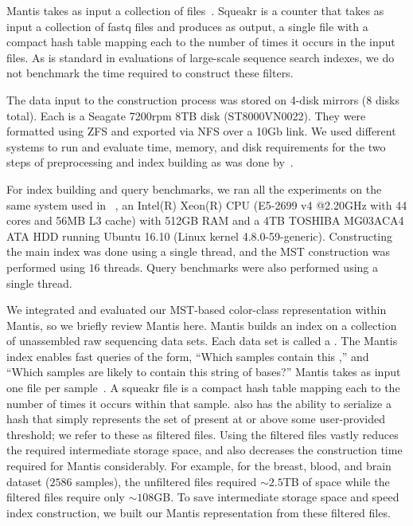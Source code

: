 Mantis takes as input a collection of  files~\cite{PandeyBeJo17}.
Squeakr is a \kmer counter that takes as input a collection of fastq
files and produces as output, a single file with a compact hash table
mapping each \kmer to the number of times it occurs in the input
files.  As is standard in evaluations of large-scale sequence search indexes,
we do not benchmark the time required to construct these filters.

The data input to the construction process
was stored on 4-disk mirrors (8 disks
total).  Each is a Seagate 7200rpm 8TB disk (ST8000VN0022). They were formatted
using ZFS and exported via NFS over a 10Gb link.
We used different systems to run and evaluate time, memory,
and disk requirements for the two steps of preprocessing and
index building as was done by~\citet{mantis}.

For index building and query benchmarks, we ran all the experiments on
the same system used in \mantis~\citep{mantis}, an
Intel(R) Xeon(R) CPU (E5-2699 v4 @2.20GHz with 44 cores and 56MB L3 cache) with
512GB RAM and a 4TB TOSHIBA MG03ACA4 ATA HDD running Ubuntu 16.10 (Linux kernel
4.8.0-59-generic).  Constructing the main index was done using a single thread,
and the MST construction was performed using $16$ threads.  Query benchmarks
were also performed using a single thread.


We integrated and evaluated our MST-based color-class representation
within Mantis, so we briefly review Mantis here. Mantis builds an index on a
collection of unassembled raw sequencing data sets. Each data set is called a
. The Mantis index enables fast queries of the form, ``Which
samples contain this \kmer,'' and ``Which samples are likely to contain this
string of bases?'' Mantis takes as input one  file per
sample~\cite{PandeyBeJo17}. A squeakr file is a compact hash table mapping each
\kmer to the number of times it occurs within that sample. \squeakr also has the
ability to serialize a hash that simply represents the set of \kmers present at
or above some user-provided threshold; we refer to these as filtered \squeakr
files. Using the filtered \squeakr files vastly reduces the required
intermediate storage space, and also decreases the construction time required
for Mantis considerably. For example, for the breast, blood, and brain dataset
($2586$ samples), the unfiltered \squeakr files required $\sim2.5$TB of space
while the filtered files require only $\sim108$GB. To save intermediate storage
space and speed index construction, we built our Mantis representation from
these filtered \squeakr files.


